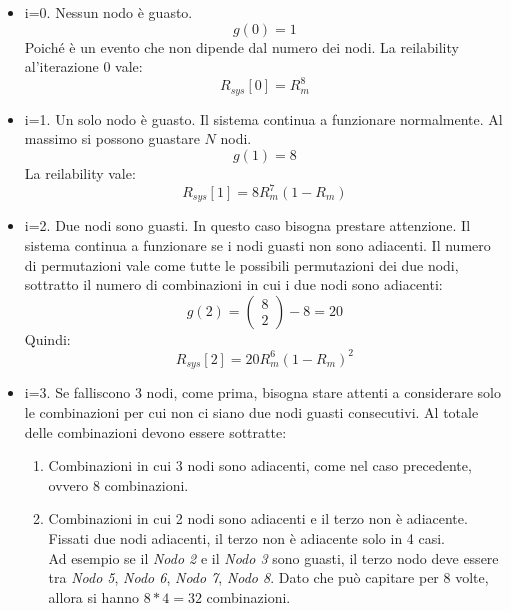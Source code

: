\begin{itemize}
	\item i=0. Nessun nodo è guasto.
	\begin{equation*}
		g(0) = 1 
	\end{equation*}
	Poiché è un evento che non dipende dal numero dei nodi. La reilability al'iterazione 0 vale:
	\begin{equation*}
		R_{sys}[0] = R_m^8
	\end{equation*}
	\item i=1. Un solo nodo è guasto. Il sistema continua a funzionare normalmente. Al massimo si possono guastare $N$ nodi.
	\begin{equation*}
		g(1) = 8
	\end{equation*}
	La reilability vale:
	\begin{equation*}
	R_{sys}[1] = 8 R_m^7 (1-R_m)
	\end{equation*}	
	\item i=2. Due nodi sono guasti. In questo caso bisogna prestare attenzione. Il sistema continua a funzionare se i nodi guasti non sono adiacenti. Il numero di permutazioni vale come tutte le possibili permutazioni dei due nodi, sottratto il numero di combinazioni in cui i due nodi sono adiacenti:
	\begin{equation*}
		g(2) = \begin{pmatrix}
			8 \\ 2
		\end{pmatrix} - 8 = 20
	\end{equation*}
	Quindi:
	\begin{equation*}
		R_{sys}[2] = 20 R_m^6 (1-R_m)^2
	\end{equation*}	
	\item i=3. Se falliscono 3 nodi, come prima, bisogna stare attenti a considerare solo le combinazioni per cui non ci siano due nodi guasti consecutivi. Al totale delle combinazioni devono essere sottratte:
	\begin{enumerate}
		\item Combinazioni in cui 3 nodi sono adiacenti, come nel caso precedente, ovvero 8 combinazioni.
		\item Combinazioni in cui 2 nodi sono adiacenti e il terzo non è adiacente. Fissati due nodi adiacenti, il terzo non è adiacente solo in 4 casi. \\Ad esempio se il \textit{Nodo 2} e il \textit{Nodo 3} sono guasti, il terzo nodo deve essere tra \textit{Nodo 5}, \textit{Nodo 6}, \textit{Nodo 7}, \textit{Nodo 8}. Dato che può capitare per 8 volte, allora si hanno $8*4=32$ combinazioni.

\end{enumerate}
\end{itemize}
